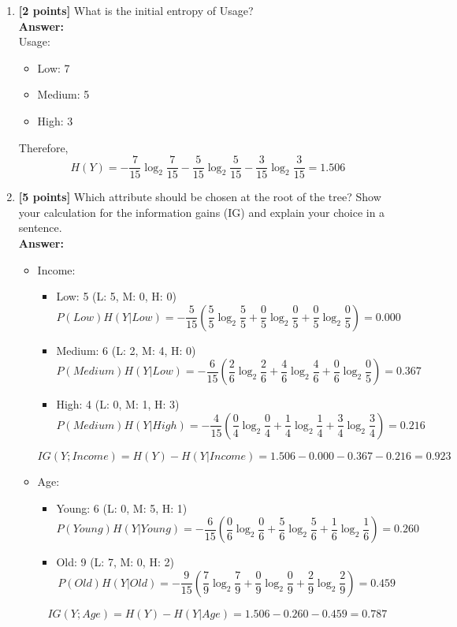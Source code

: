 \begin{enumerate}

\item\textbf{[2 points]} What is the initial entropy of Usage?
\\\textbf{Answer:}\\
Usage:
\begin{itemize}
	\item Low: 7
	\item Medium: 5
	\item High: 3
\end{itemize}
Therefore,
$$H(Y)=-\frac{7}{15}\log_2\frac{7}{15}-\frac{5}{15}\log_2\frac{5}{15}-\frac{3}{15}\log_2\frac{3}{15}=1.506$$

\item\textbf{[5 points]} Which attribute should be chosen at the root of the tree? Show your calculation for the information gains (IG) and explain your choice in a sentence.
\\\textbf{Answer:}\\
\begin{itemize}
	\item Income:
	\begin{itemize}
		\item Low: 5 (L: 5, M: 0, H: 0)
		$$P(Low)H(Y|Low)=-\frac{5}{15}(\frac{5}{5}\log_2\frac{5}{5}+\frac{0}{5}\log_2\frac{0}{5}+\frac{0}{5}\log_2\frac{0}{5})=0.000$$
		\item Medium: 6 (L: 2, M: 4, H: 0)
		$$P(Medium)H(Y|Low)=-\frac{6}{15}(\frac{2}{6}\log_2\frac{2}{6}+\frac{4}{6}\log_2\frac{4}{6}+\frac{0}{6}\log_2\frac{0}{5})=0.367$$
		\item High: 4 (L: 0, M: 1, H: 3)
		$$P(Medium)H(Y|High)=-\frac{4}{15}(\frac{0}{4}\log_2\frac{0}{4}+\frac{1}{4}\log_2\frac{1}{4}+\frac{3}{4}\log_2\frac{3}{4})=0.216$$
	\end{itemize}
	$$IG(Y;Income)=H(Y)-H(Y|Income)=1.506-0.000-0.367-0.216=0.923$$
	\item Age:
	\begin{itemize}
		\item Young: 6 (L: 0, M: 5, H: 1)
		$$P(Young)H(Y|Young)=-\frac{6}{15}(\frac{0}{6}\log_2\frac{0}{6}+\frac{5}{6}\log_2\frac{5}{6}+\frac{1}{6}\log_2\frac{1}{6})=0.260$$
		\item Old: 9 (L: 7, M: 0, H: 2)
		$$P(Old)H(Y|Old)=-\frac{9}{15}(\frac{7}{9}\log_2\frac{7}{9}+\frac{0}{9}\log_2\frac{0}{9}+\frac{2}{9}\log_2\frac{2}{9})=0.459$$
	\end{itemize}
	$$IG(Y;Age)=H(Y)-H(Y|Age)=1.506-0.260-0.459=0.787$$

\end{itemize}
\end{enumerate}
